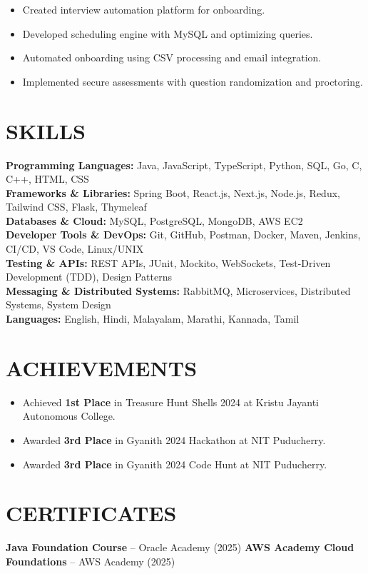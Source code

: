 \documentclass[10pt,a4paper]{article}
\begin{document}
\begin{itemize}

\item Created interview automation platform for onboarding.

\item Developed scheduling engine with MySQL and optimizing queries.

\item Automated onboarding using CSV processing and email integration.

\item Implemented secure assessments with question randomization and proctoring.

\end{itemize}
\section*{SKILLS}

\small

\textbf{Programming Languages:}
Java, JavaScript, TypeScript, Python, SQL, Go, C, C++, HTML, CSS
\\[2pt]
\textbf{Frameworks \& Libraries:}
Spring Boot, React.js, Next.js, Node.js, Redux, Tailwind CSS, Flask, Thymeleaf
\\[2pt]
\textbf{Databases \& Cloud:}
MySQL, PostgreSQL, MongoDB, AWS EC2
\\[2pt]
\textbf{Developer Tools \& DevOps:}
Git, GitHub, Postman, Docker, Maven, Jenkins, CI/CD, VS Code, Linux/UNIX
\\[2pt]
\textbf{Testing \& APIs:}
REST APIs, JUnit, Mockito, WebSockets, Test-Driven Development (TDD), Design Patterns
\\[2pt]
\textbf{Messaging \& Distributed Systems:}
RabbitMQ, Microservices, Distributed Systems, System Design
\\[2pt]
\textbf{Languages:}
English, Hindi, Malayalam, Marathi, Kannada, Tamil


\section*{ACHIEVEMENTS}

\begin{itemize}

\item Achieved \textbf{1st Place} in Treasure Hunt Shells 2024 at Kristu Jayanti Autonomous College.

\item Awarded \textbf{3rd Place} in Gyanith 2024 Hackathon at NIT Puducherry.

\item Awarded \textbf{3rd Place} in Gyanith 2024 Code Hunt at NIT Puducherry.

\end{itemize}


\section*{CERTIFICATES}
\small
\textbf{Java Foundation Course} -- Oracle Academy (2025)
\hfill
\textbf{AWS Academy Cloud Foundations} -- AWS Academy (2025)
\end{document}

